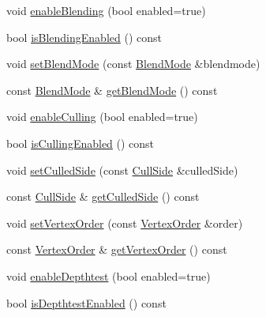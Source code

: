 \begin{DoxyCompactItemize}
\item 
void \hyperlink{classburn_1_1_open_gl_control_1_1_settings_a86141ea2923ddf7100be7d09a4f57e70}{enable\-Blending} (bool enabled=true)
\item 
bool \hyperlink{classburn_1_1_open_gl_control_1_1_settings_a31424767c7990ddb3bab81a0c07112da}{is\-Blending\-Enabled} () const 
\item 
void \hyperlink{classburn_1_1_open_gl_control_1_1_settings_a06272e79a71c5f89db3e9afbee08c87c}{set\-Blend\-Mode} (const \hyperlink{classburn_1_1_open_gl_control_a2b90956aa23e041f3568234986641ba6}{Blend\-Mode} \&blendmode)
\item 
const \hyperlink{classburn_1_1_open_gl_control_a2b90956aa23e041f3568234986641ba6}{Blend\-Mode} \& \hyperlink{classburn_1_1_open_gl_control_1_1_settings_a2caee0abe87d21d8d25d675c7bf3ce85}{get\-Blend\-Mode} () const 
\item 
void \hyperlink{classburn_1_1_open_gl_control_1_1_settings_a8a9436b332aeb7ad01dc661ff29bf120}{enable\-Culling} (bool enabled=true)
\item 
bool \hyperlink{classburn_1_1_open_gl_control_1_1_settings_ae658f9b1d31076e2d3dee854e2a2364f}{is\-Culling\-Enabled} () const 
\item 
void \hyperlink{classburn_1_1_open_gl_control_1_1_settings_abd4480405bdc2050a76319df4f9a6422}{set\-Culled\-Side} (const \hyperlink{classburn_1_1_open_gl_control_a60b866f2c1b2b210e618c39ef72f556b}{Cull\-Side} \&culled\-Side)
\item 
const \hyperlink{classburn_1_1_open_gl_control_a60b866f2c1b2b210e618c39ef72f556b}{Cull\-Side} \& \hyperlink{classburn_1_1_open_gl_control_1_1_settings_aa8b8594b7f9451a5921ab4e2c2a13660}{get\-Culled\-Side} () const 
\item 
void \hyperlink{classburn_1_1_open_gl_control_1_1_settings_a5e05f89ddf398d5d96224101cb6c6da5}{set\-Vertex\-Order} (const \hyperlink{classburn_1_1_open_gl_control_a1df746e6b8ad5c42abcfd607ef514aba}{Vertex\-Order} \&order)
\item 
const \hyperlink{classburn_1_1_open_gl_control_a1df746e6b8ad5c42abcfd607ef514aba}{Vertex\-Order} \& \hyperlink{classburn_1_1_open_gl_control_1_1_settings_a63c83ba6a41c786e81e19fe6463e7a8b}{get\-Vertex\-Order} () const 
\item 
void \hyperlink{classburn_1_1_open_gl_control_1_1_settings_ae280732e14b6e40bc75d71d084fbb606}{enable\-Depthtest} (bool enabled=true)
\item 
bool \hyperlink{classburn_1_1_open_gl_control_1_1_settings_afc53b39d703edbc692599f9deb2a038f}{is\-Depthtest\-Enabled} () const 

\end{DoxyCompactItemize}
